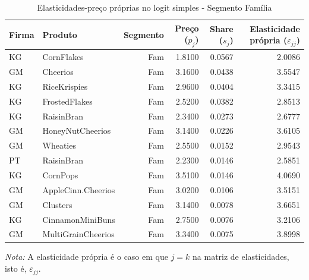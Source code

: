 


\begingroup
\begin{table}[H]
\centering
\caption{Elasticidades-preço próprias no logit simples - Segmento Família}
\label{tab:own-elasticities-simple-fam}
\small
\begin{tabular}{llrrrr}
\toprule
Firma & Produto & Segmento & Preço ($p_j$) & Share ($s_j$) & Elasticidade própria ($\varepsilon_{jj}$) \\
\midrule
KG & CornFlakes & Fam & 1.8100 & 0.0567 & 2.0086 \\
GM & Cheerios & Fam & 3.1600 & 0.0438 & 3.5547 \\
KG & RiceKrispies & Fam & 2.9600 & 0.0404 & 3.3415 \\
KG & FrostedFlakes & Fam & 2.5200 & 0.0382 & 2.8513 \\
KG & RaisinBran & Fam & 2.3400 & 0.0273 & 2.6777 \\
GM & HoneyNutCheerios & Fam & 3.1400 & 0.0226 & 3.6105 \\
GM & Wheaties & Fam & 2.5500 & 0.0152 & 2.9543 \\
PT & RaisinBran & Fam & 2.2300 & 0.0146 & 2.5851 \\
KG & CornPops & Fam & 3.5100 & 0.0146 & 4.0690 \\
GM & AppleCinn.Cheerios & Fam & 3.0200 & 0.0106 & 3.5151 \\
GM & Clusters & Fam & 3.1400 & 0.0078 & 3.6651 \\
KG & CinnamonMiniBuns & Fam & 2.7500 & 0.0076 & 3.2106 \\
GM & MultiGrainCheerios & Fam & 3.3400 & 0.0075 & 3.8998 \\
\bottomrule
\end{tabular}

\vspace{0.3em}
\footnotesize
\textit{Nota:} A elasticidade própria é o caso em que $j=k$ na matriz de elasticidades, isto é, $\varepsilon_{jj}$.
\end{table}
\endgroup


